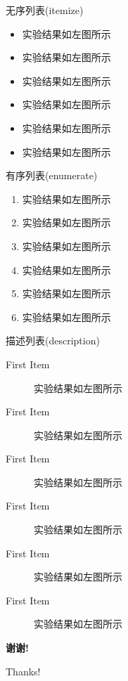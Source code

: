 \documentclass[8pt,compress,t,notheorems,noamsthm,notheorem,xcolor=x11names]{beamer}
\theoremstyle{nonumberplain}%
\theoremstyle{plain}
\begin{document}

\begin{frame}{无序列表(itemize)}
	\begin{itemize}
		\item 实验结果如左图所示
		\item 实验结果如左图所示
		\item 实验结果如左图所示
		\item 实验结果如左图所示
		\item 实验结果如左图所示
		\item 实验结果如左图所示
	\end{itemize}
\end{frame}

\begin{frame}{有序列表(enumerate)}
	\begin{enumerate}
	\item 实验结果如左图所示
	\item 实验结果如左图所示
	\item 实验结果如左图所示
	\item 实验结果如左图所示
	\item 实验结果如左图所示
	\item 实验结果如左图所示
	\end{enumerate}
\end{frame}

\begin{frame}{描述列表(description)}
	\begin{description}
	\item[First Item] 实验结果如左图所示
	\item[First Item] 实验结果如左图所示
	\item[First Item] 实验结果如左图所示
	\item[First Item] 实验结果如左图所示
	\item[First Item] 实验结果如左图所示
	\item[First Item] 实验结果如左图所示
	\end{description}
\end{frame}

\begin{frame}[c,plain]
\begin{center}
\Huge\color{red}\heiti\bfseries 谢\quad 谢!

  Thanks!
\end{center}
\end{frame}
\end{document}
